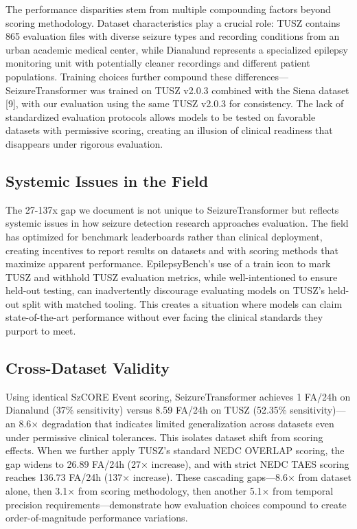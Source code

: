\documentclass[
]{article}
\begin{document}
The performance disparities stem from multiple compounding factors
beyond scoring methodology. Dataset characteristics play a crucial role:
TUSZ contains 865 evaluation files with diverse seizure types and
recording conditions from an urban academic medical center, while
Dianalund represents a specialized epilepsy monitoring unit with
potentially cleaner recordings and different patient populations.
Training choices further compound these differences---SeizureTransformer
was trained on TUSZ v2.0.3 combined with the Siena dataset {[}9{]}, with
our evaluation using the same TUSZ v2.0.3 for consistency. The lack of
standardized evaluation protocols allows models to be tested on
favorable datasets with permissive scoring, creating an illusion of
clinical readiness that disappears under rigorous evaluation.

\hypertarget{systemic-issues-in-the-field}{%
\subsection{Systemic Issues in the
Field}\label{systemic-issues-in-the-field}}

The 27-137x gap we document is not unique to SeizureTransformer but
reflects systemic issues in how seizure detection research approaches
evaluation. The field has optimized for benchmark leaderboards rather
than clinical deployment, creating incentives to report results on
datasets and with scoring methods that maximize apparent performance.
EpilepsyBench's use of a train icon to mark TUSZ and withhold TUSZ
evaluation metrics, while well-intentioned to ensure held-out testing,
can inadvertently discourage evaluating models on TUSZ's held-out split
with matched tooling. This creates a situation where models can claim
state-of-the-art performance without ever facing the clinical standards
they purport to meet.

\hypertarget{cross-dataset-validity}{%
\subsection{Cross-Dataset Validity}\label{cross-dataset-validity}}

Using identical SzCORE Event scoring, SeizureTransformer achieves 1
FA/24h on Dianalund (37\% sensitivity) versus 8.59 FA/24h on TUSZ
(52.35\% sensitivity)---an 8.6× degradation that indicates limited
generalization across datasets even under permissive clinical
tolerances. This isolates dataset shift from scoring effects. When we
further apply TUSZ's standard NEDC OVERLAP scoring, the gap widens to
26.89 FA/24h (27× increase), and with strict NEDC TAES scoring reaches
136.73 FA/24h (137× increase). These cascading gaps---8.6× from dataset
alone, then 3.1× from scoring methodology, then another 5.1× from
temporal precision requirements---demonstrate how evaluation choices
compound to create order-of-magnitude performance variations.
\end{document}
